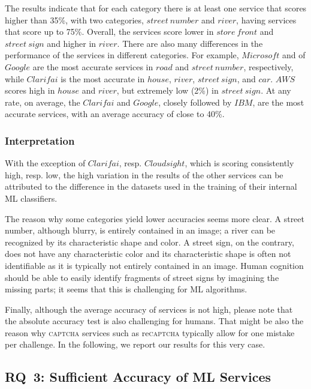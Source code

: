 \documentclass[sigconf,review,anonymous]{acmart}
\newcommand{\captcha}{\textsc{captcha}\xspace}
\begin{document}
The results indicate that for each category there is at least one service that scores higher than 35\%, with two categories, $street~number$ and $river$, having services that score up to 75\%.
Overall, the services score lower in $store~front$ and $street~sign$ and higher in $river$. 
There are also many differences in the performance of the services in different categories.
For example, $Microsoft$ and of $Google$ are the most accurate services in $road$ and $street~number$, respectively, while $Clarifai$ is the most accurate in $house$, $river$, $street~sign$, and $car$. 
$AWS$ scores high in $house$ and $river$, but extremely low (2\%) in $street~sign$. 
At any rate, on average, the $Clarifai$ and $Google$, closely followed by $IBM$, are the most accurate services, with an average accuracy of close to 40\%.

\subsubsection*{Interpretation}
With the exception of $Clarifai$, resp. $Cloudsight$, which is scoring consistently high, resp. low, the high variation in the results of the other services can be attributed to the difference in the datasets used in the training of their internal ML classifiers. 

The reason why some categories yield lower accuracies seems more clear. 
A street number, although blurry, is entirely contained in an image; a river can be recognized by its characteristic shape and color.  
A street sign, on the contrary, does not have any characteristic color and its characteristic shape is often not identifiable as it is typically not entirely contained in an image. Human cognition should be able to easily identify fragments of street signs by imagining the missing parts; it seems that this is challenging for ML algorithms.

Finally, although the average accuracy of services is not high, please note that the absolute accuracy test is also challenging for humans. That might be also the reason why \captcha services such as re\captcha typically allow for one mistake per challenge. In the following, we report our results for this very case.


\subsection{RQ~3: Sufficient Accuracy of ML Services}
\end{document}
